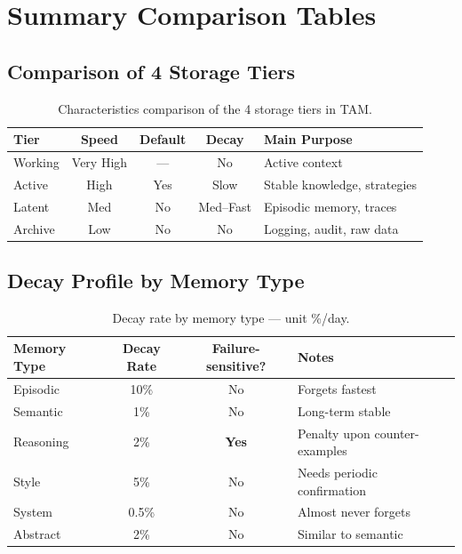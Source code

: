 \documentclass[a4paper,12pt]{article}
\begin{document}
\section{Summary Comparison Tables}

\subsection*{Comparison of 4 Storage Tiers}

\begin{table}[H]
\centering
\caption{Characteristics comparison of the 4 storage tiers in TAM.}
\label{tab:tiers}
\begin{tabularx}{\textwidth}{l c c c X}
\toprule
\textbf{Tier} & \textbf{Speed} & \textbf{Default} & \textbf{Decay} & \textbf{Main Purpose} \\
\midrule
Working  & \textcolor{tamgreen}{Very High} & --- & No & Active context \\
Active   & \textcolor{tamblue}{High}     & Yes  & Slow  & Stable knowledge, strategies \\
Latent   & \textcolor{tamorange}{Med}     & No & Med--Fast & Episodic memory, traces \\
Archive  & \textcolor{tamred}{Low}      & No & No & Logging, audit, raw data \\
\bottomrule
\end{tabularx}
\end{table}

\subsection*{Decay Profile by Memory Type}

\begin{table}[H]
\centering
\caption{Decay rate by memory type --- unit \%/day.}
\label{tab:decay}
\begin{tabular}{lccl}
\toprule
\textbf{Memory Type} & \textbf{Decay Rate} & \textbf{Failure-sensitive?} & \textbf{Notes} \\
\midrule
Episodic  & 10\%  & No & Forgets fastest \\
Semantic  & 1\%   & No & Long-term stable \\
Reasoning & 2\%   & \textbf{Yes} & Penalty upon counter-examples \\
Style     & 5\%   & No & Needs periodic confirmation \\
System    & 0.5\% & No & Almost never forgets \\
Abstract  & 2\%   & No & Similar to semantic \\
\bottomrule
\end{tabular}
\end{table}
\end{document}
